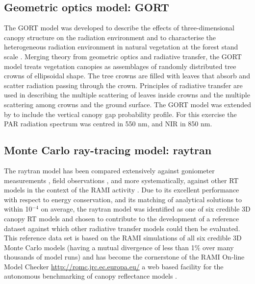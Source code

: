 \subsection{Geometric optics model: GORT}\label{section:gort}
The GORT model was developed to describe the effects of three-dimensional canopy structure on the radiation environment and to characterise the heterogeneous radiation environment in natural vegetation at the forest stand scale \citep{Ni-Meister2010}. Merging theory from geometric optics and radiative transfer, the GORT model treats vegetation canopies as assemblages of randomly distributed tree crowns of ellipsoidal shape. The tree crowns are filled with leaves that absorb and scatter radiation passing through the crown. Principles of radiative transfer are used in describing the multiple scattering of leaves inside crowns and the multiple scattering among crowns and the ground surface. The GORT model was extended by \citet{Ni1997} to include the vertical canopy gap probability profile. For this exercise the PAR radiation spectrum was centred in 550 nm, and NIR in 850 nm.

\subsection{Monte Carlo ray-tracing model: raytran}\label{section:raytran}



The raytran model has been compared extensively against goniometer measurements \citep{Govaerts1995}, field observations \citep{Widlowski2005}, and more systematically, against other RT models in the context of the RAMI activity \citep{Pinty2001,Pinty2004,Widlowski2007}. Due to its excellent performance with respect to energy conservation, and its matching of analytical solutions to within 10$^{−4}$ on average, the raytran model was identified as one of six credible 3D canopy RT models and chosen to contribute to the development of a reference dataset against which other radiative transfer models could then be evaluated. This reference data set is based on the RAMI simulations of all six credible 3D Monte Carlo models (having a mutual divergence of less than 1\% over many thousands of model runs) and has become the cornerstone of the RAMI On‐line Model Checker \url{http://romc.jrc.ec.europa.eu/} a web based facility for the autonomous benchmarking of canopy reflectance models \citep{Widlowski2008}.

